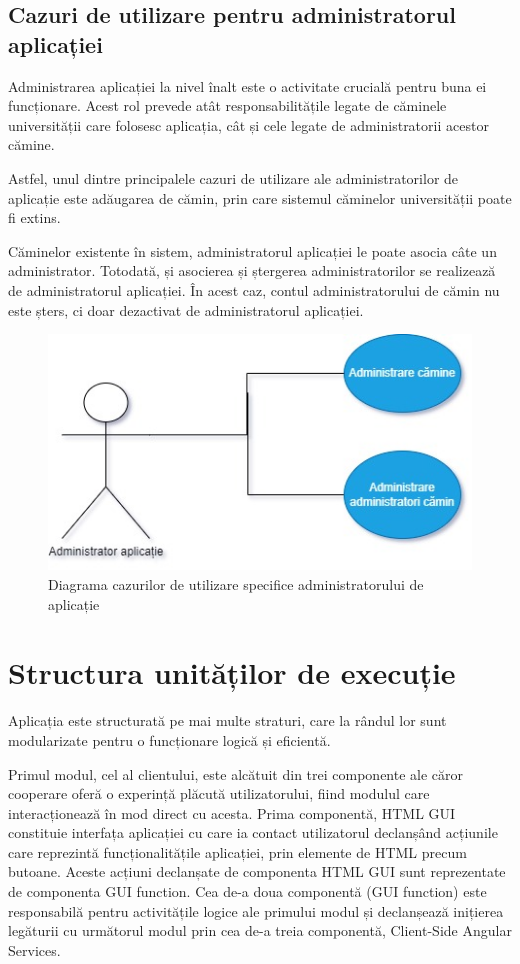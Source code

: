\documentclass[12pt,a4paper]{report}
\theoremstyle{definition}
\theoremstyle{remark}
\begin{document}
\subsection{Cazuri de utilizare pentru administratorul aplicației}
\par Administrarea aplicației la nivel înalt este o activitate crucială pentru buna ei funcționare. Acest rol prevede atât responsabilitățile legate de căminele universității care folosesc aplicația, cât și cele legate de administratorii acestor cămine.

\par Astfel, unul dintre principalele cazuri de utilizare ale administratorilor de aplicație este adăugarea de cămin, prin care sistemul căminelor universității poate fi extins.

\par Căminelor existente în sistem, administratorul aplicației le poate asocia câte un administrator. Totodată, și asocierea și ștergerea administratorilor se realizează de administratorul aplicației. În acest caz, contul administratorului de cămin nu este șters, ci doar dezactivat de administratorul aplicației.

\begin{figure}[H]
    \centering
    \includegraphics[width=0.5\linewidth, height=0.2\textheight]{resurse/diagrame/UVTDorms_UseCaseAdministratorAplicatie.jpg}
    \caption{Diagrama cazurilor de utilizare specifice administratorului de aplicație}
\end{figure}

\section{Structura unităților de execuție}
\par Aplicația este structurată pe mai multe straturi, care la rândul lor sunt modularizate pentru o funcționare logică și eficientă.

\par Primul modul, cel al clientului, este alcătuit din trei componente ale căror cooperare oferă o experință plăcută utilizatorului, fiind modulul care interacționează în mod direct cu acesta. Prima componentă, HTML GUI constituie interfața aplicației cu care ia contact utilizatorul declanșând acțiunile care reprezintă funcționalitățile aplicației, prin elemente de HTML precum butoane. Aceste acțiuni declanșate de componenta HTML GUI sunt reprezentate de componenta GUI function. Cea de-a doua componentă (GUI function) este responsabilă pentru activitățile logice ale primului modul și declanșează inițierea legăturii cu următorul modul prin cea de-a treia componentă, Client-Side Angular Services.
\end{document}
